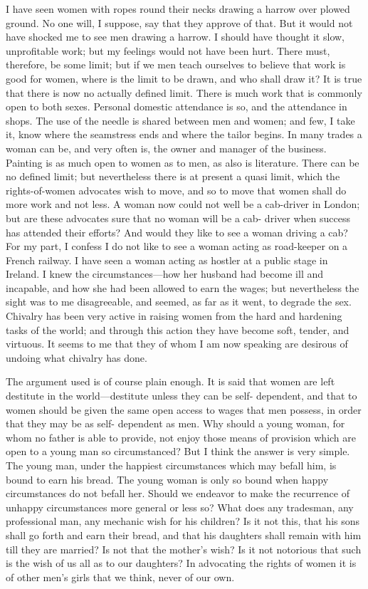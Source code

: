 I have seen women with ropes round their necks drawing a harrow
over plowed ground.  No one will, I suppose, say that they approve
of that.  But it would not have shocked me to see men drawing a
harrow.  I should have thought it slow, unprofitable work; but my
feelings would not have been hurt.  There must, therefore, be some
limit; but if we men teach ourselves to believe that work is good
for women, where is the limit to be drawn, and who shall draw it?
It is true that there is now no actually defined limit.  There is
much work that is commonly open to both sexes.  Personal domestic
attendance is so, and the attendance in shops.  The use of the
needle is shared between men and women; and few, I take it, know
where the seamstress ends and where the tailor begins.  In many
trades a woman can be, and very often is, the owner and manager of
the business.  Painting is as much open to women as to men, as also
is literature.  There can be no defined limit; but nevertheless
there is at present a quasi limit, which the rights-of-women
advocates wish to move, and so to move that women shall do more
work and not less.  A woman now could not well be a cab-driver in
London; but are these advocates sure that no woman will be a cab-
driver when success has attended their efforts?  And would they
like to see a woman driving a cab?  For my part, I confess I do not
like to see a woman acting as road-keeper on a French railway.  I
have seen a woman acting as hostler at a public stage in Ireland.
I knew the circumstances---how her husband had become ill and
incapable, and how she had been allowed to earn the wages; but
nevertheless the sight was to me disagreeable, and seemed, as far
as it went, to degrade the sex.  Chivalry has been very active in
raising women from the hard and hardening tasks of the world; and
through this action they have become soft, tender, and virtuous.
It seems to me that they of whom I am now speaking are desirous of
undoing what chivalry has done.

The argument used is of course plain enough.  It is said that women
are left destitute in the world---destitute unless they can be self-
dependent, and that to women should be given the same open access
to wages that men possess, in order that they may be as self-
dependent as men.  Why should a young woman, for whom no father is
able to provide, not enjoy those means of provision which are open
to a young man so circumstanced?  But I think the answer is very
simple.  The young man, under the happiest circumstances which may
befall him, is bound to earn his bread.  The young woman is only so
bound when happy circumstances do not befall her.  Should we
endeavor to make the recurrence of unhappy circumstances more
general or less so?  What does any tradesman, any professional man,
any mechanic wish for his children?  Is it not this, that his sons
shall go forth and earn their bread, and that his daughters shall
remain with him till they are married?  Is not that the mother's
wish?  Is it not notorious that such is the wish of us all as to
our daughters?  In advocating the rights of women it is of other
men's girls that we think, never of our own.

